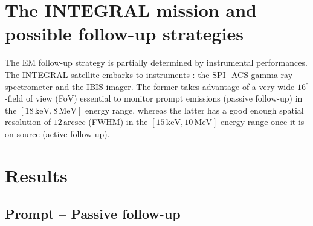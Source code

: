 \documentclass[a0,portrait]{a0poster}
\newcommand{\ECM}[1] {\textbf{\textcolor{magenta}{#1}}}
\begin{document}
\begin{multicols}{2}
\section*{The INTEGRAL mission and possible follow-up strategies}


The EM follow-up strategy is partially determined by instrumental performances. The INTEGRAL satellite embarks to instruments : the SPI- ACS gamma-ray spectrometer and the IBIS imager. The former takes advantage of a very wide $16^{\circ}$-field of view (FoV) essential to monitor prompt emissions (passive follow-up) in the  $\left[ 18 \, \mathrm{keV}, 8 \, \mathrm{MeV} \right]$  energy range, whereas the latter has a good enough spatial resolution of $12 \, \mathrm{arcsec}$ (FWHM) in the $\left[ 15 \, \mathrm{keV}, 10 \, \mathrm{MeV} \right]$ energy range once it is on source (active follow-up).



\section*{Results}

\subsection*{Prompt -- Passive follow-up}


\end{multicols}
\end{document}
